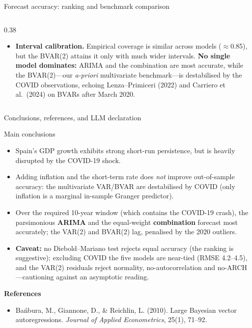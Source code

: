 \documentclass[9pt]{beamer}
\begin{document}
\begin{frame}{Forecast accuracy: ranking and benchmark comparison}
\begin{columns}
\begin{column}{0.38\textwidth}
\begin{itemize}
      \item \textbf{Interval calibration.} Empirical coverage is similar across models ($\approx$0.85), but the BVAR(2) attains it only with much wider intervals. \textbf{No single model dominates:} ARIMA and the combination are most accurate, while the BVAR(2)---our \emph{a-priori} multivariate benchmark---is destabilised by the COVID observations, echoing Lenza--Primiceri (2022) and Carriero et al.\ (2024) on BVARs after March 2020.
    \end{itemize}
  \end{column}
  
\end{columns}

\end{frame}

\begin{frame}{Conclusions, references, and LLM declaration}
\label{slide:conclusion}
\label{slide:refs}
\scriptsize

\begin{block}{Main conclusions}
\begin{itemize}\setlength{\itemsep}{1pt}\setlength{\parskip}{0pt}
  \item Spain's GDP growth exhibits strong short-run persistence, but is heavily disrupted by the COVID-19 shock.
  \item Adding inflation and the short-term rate does \emph{not} improve out-of-sample accuracy: the multivariate VAR/BVAR are destabilised by COVID (only inflation is a marginal in-sample Granger predictor).
  \item Over the required 10-year window (which contains the COVID-19 crash), the parsimonious \textbf{ARIMA} and the equal-weight \textbf{combination} forecast most accurately; the VAR(2) and BVAR(2) lag, penalised by the 2020 outliers.
  \item \textbf{Caveat:} no Diebold--Mariano test rejects equal accuracy (the ranking is suggestive); excluding COVID the five models are near-tied (RMSE 4.2--4.5), and the VAR(2) residuals reject normality, no-autocorrelation and no-ARCH---cautioning against an asymptotic reading.
\end{itemize}
\end{block}

\textbf{References}
\begin{itemize}\setlength{\itemsep}{1pt}\setlength{\parskip}{0pt}
    \item Bańbura, M., Giannone, D., \& Reichlin, L. (2010). Large Bayesian vector autoregressions. \textit{Journal of Applied Econometrics}, 25(1), 71--92.
    

\end{itemize}
\end{frame}
\end{document}
